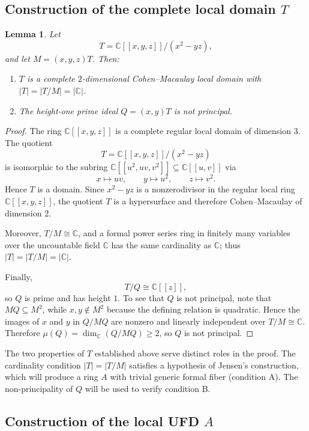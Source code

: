 \documentclass[]{pkuai4m}
\theoremstyle{plain}
\newtheorem{lemma}[theorem]{Lemma}
\theoremstyle{definition}
\begin{document}
\subsection*{Construction of the complete local domain $T$}

\begin{lemma}\label{lem:complete_domain_choice-appendix}
Let
\[
T = \mathbb{C}[[x,y,z]]/(x^2 - yz),
\]
and let $M = (x,y,z)T$. Then:
\begin{enumerate}
\item $T$ is a complete $2$-dimensional Cohen–Macaulay local domain with $|T| = |T/M| = |\mathbb{C}|$.
\item The height-one prime ideal $Q = (x,y)T$ is not principal.
\end{enumerate}
\end{lemma}

\begin{proof}
The ring $\mathbb{C}[[x,y,z]]$ is a complete regular local domain of dimension $3$. The quotient
\[
T = \mathbb{C}[[x,y,z]]/(x^2 - yz)
\]
is isomorphic to the subring $\mathbb{C}[[u^2, uv, v^2]] \subseteq \mathbb{C}[[u,v]]$ via
\[
x \mapsto uv,\qquad y \mapsto u^2,\qquad z \mapsto v^2.
\]
Hence $T$ is a domain. Since $x^2 - yz$ is a nonzerodivisor in the regular local ring $\mathbb{C}[[x,y,z]]$, the quotient $T$ is a hypersurface and therefore Cohen–Macaulay of dimension $2$.

Moreover, $T/M \cong \mathbb{C}$, and a formal power series ring in finitely many variables over the uncountable field $\mathbb{C}$ has the same cardinality as $\mathbb{C}$; thus $|T| = |T/M| = |\mathbb{C}|$.

Finally,
\[
T/Q \cong \mathbb{C}[[z]],
\]
so $Q$ is prime and has height $1$. To see that $Q$ is not principal, note that $MQ \subseteq M^2$, while $x, y \notin M^2$ because the defining relation is quadratic. Hence the images of $x$ and $y$ in $Q/MQ$ are nonzero and linearly independent over $T/M \cong \mathbb{C}$. Therefore $\mu(Q) = \dim_{\mathbb{C}}(Q/MQ) \ge 2$, so $Q$ is not principal.
\end{proof}

The two properties of $T$ established above serve distinct roles in the proof. The cardinality condition $|T| = |T/M|$ satisfies a hypothesis of Jensen's construction, which will produce a ring $A$ with trivial generic formal fiber (condition A). The non-principality of $Q$ will be used to verify condition B.

\subsection*{Construction of the local UFD $A$}
\end{document}

